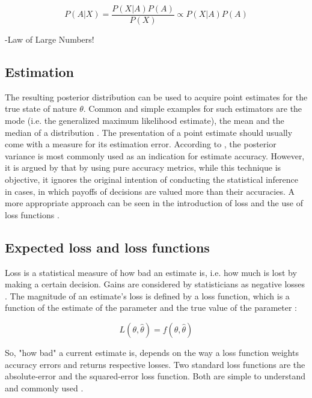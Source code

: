         \begin{equation}\label{eq:BayesTheorem}
        P(A|X) = \frac{P(X|A)P(A)}{P(X)}
        \propto P(X|A)P(A)
        \end{equation}
        
        -Law of Large Numbers!
               
        \subsection{Estimation}
        The resulting posterior distribution can be used to acquire point estimates for the true state of nature $\theta$. Common and simple examples for such estimators are the mode (i.e. the generalized maximum likelihood estimate), the mean and the median of a distribution \cite{berger2013stat}. The presentation of a point estimate should usually come with a measure for its estimation error. According to \cite{berger2013stat}, the posterior variance is most commonly used as an indication for estimate accuracy. However, it is argued by \cite{davidson2015} that by using pure accuracy metrics, while this technique is objective, it ignores the original intention of conducting the statistical inference in cases, in which payoffs of decisions are valued more than their accuracies. A more appropriate approach can be seen in the introduction of loss and the use of loss functions \cite{davidson2015}.
        
        \subsection{Expected loss and loss functions} 
        Loss is a statistical measure of how bad an estimate is, i.e. how much is lost by making a certain decision. Gains are considered by statisticians as negative losses \cite{davidson2015}.
        The magnitude of an estimate's loss is defined by a loss function, which is a function of the estimate of the parameter and the true value of the parameter \cite{davidson2015}:
        
        \begin{equation}\label{eq:LossFunction}
        L(\theta,\hat{\theta}) = f(\theta,\hat{\theta})
        \end{equation}
        
        So, "how bad" a current estimate is, depends on the way a loss function weights accuracy errors and returns respective losses. Two standard loss functions are the absolute-error and the squared-error loss function. Both are simple to understand and commonly used \cite{davidson2015}.
        
